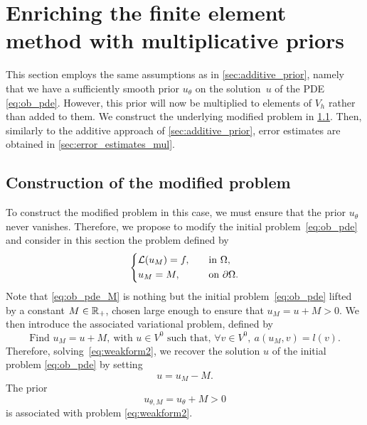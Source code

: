 \section{Enriching the finite element method with multiplicative priors}
\label{sec:multiplicative_prior}

This section employs the same assumptions as in \cref{sec:additive_prior}, namely that we have a sufficiently smooth prior $u_\theta$ on the solution~$u$ of the PDE \eqref{eq:ob_pde}.
However, this prior will now be multiplied to elements of $V_h$ rather than added to them.
We construct the underlying modified problem in \cref{sec:modified_problem_mul}.
Then, similarly to the additive approach of \cref{sec:additive_prior}, error estimates are obtained in \cref{sec:error_estimates_mul}.
\subsection{Construction of the modified problem}
\label{sec:modified_problem_mul}

To construct the modified problem in this case, we must ensure that the prior $u_\theta$ never vanishes.
Therefore, we propose to modify the initial problem~\eqref{eq:ob_pde} and consider in this section the problem defined by
\begin{equation}
	\label{eq:ob_pde_M}
	\begin{dcases}
		\mathcal{L}(u_M)=f, &
		\text{\quad in } \Omega,          \\
		u_M = %
		M,                  &
		\text{\quad on } \partial \Omega. \\
	\end{dcases}
\end{equation}
Note that \eqref{eq:ob_pde_M} is nothing but the initial problem~\eqref{eq:ob_pde} lifted by a constant $M \in \mathbb{R}_+$, chosen large enough to ensure that $u_M=u+M>0$.
We then introduce the associated variational problem, defined by
\begin{equation}
	\label{eq:weakform2}
	\text{Find } u_M = u + M,~\text{with }u \in V^0 \text{ such that, }
	\forall v\in V^0,~ a(u_M,v)=l(v).
\end{equation}
Therefore, solving~\eqref{eq:weakform2}, we recover the solution $u$ of the initial problem \eqref{eq:ob_pde} by setting \[u = u_M - M.\]
The prior \[u_{\theta,M}=u_\theta+M>0\] is associated with problem \eqref{eq:weakform2}.

